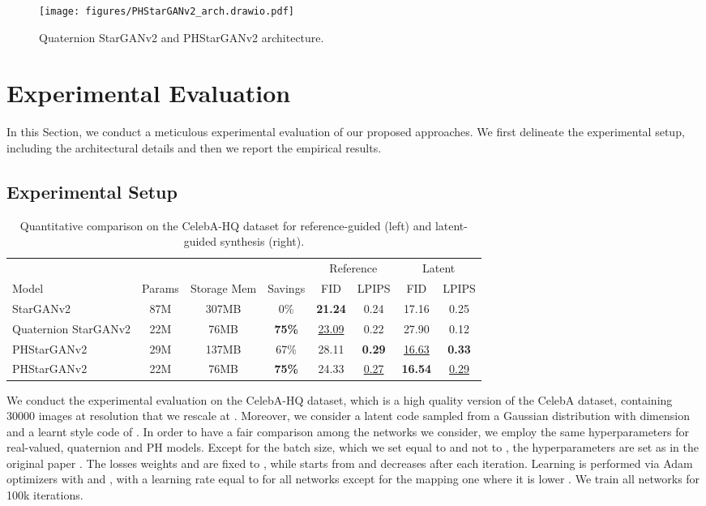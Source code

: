 \documentclass[conference]{IEEEtran}
\begin{document}
\begin{figure*}[t!]
    \centering
    \texttt{[image: figures/PHStarGANv2\_arch.drawio.pdf]}
    \caption{Quaternion StarGANv2 and PHStarGANv2 architecture.}
    \label{fig:arch}
\end{figure*}

\section{Experimental Evaluation}
\label{sec:exp}
In this Section, we conduct a meticulous experimental evaluation of our proposed approaches. We first delineate the experimental setup, including the architectural details and then we report the empirical results.

\subsection{Experimental Setup}

\begin{table*}[t]
\caption{Quantitative comparison on the CelebA-HQ dataset for reference-guided (left) and latent-guided synthesis (right).}
\centering
\label{tab:res_celeba}
\begin{tabular}{l|ccc|cc|cc}
\toprule
 & & & &  \multicolumn{2}{c|}{Reference} & \multicolumn{2}{c}{Latent}  \\
Model & Params & Storage Mem & Savings  & FID  & LPIPS  & FID  & LPIPS  \\
\hline
StarGANv2 & 87M & 307MB & 0\% & \textbf{21.24} & 0.24 & 17.16 & 0.25 \\
Quaternion StarGANv2 & 22M & 76MB & \textbf{75\%} & \underline{23.09} & 0.22 & 27.90 & 0.12 \\
PHStarGANv2  & 29M & 137MB & 67\% & 28.11 & \textbf{0.29} & \underline{16.63} & \textbf{0.33} \\
PHStarGANv2  & 22M & 76MB & \textbf{75\%} & 24.33 & \underline{0.27} & \textbf{16.54} & \underline{0.29} \\
\bottomrule
\end{tabular}
\end{table*}

We conduct the experimental evaluation on the CelebA-HQ dataset, which is a high quality version of the CelebA dataset, containing 30000 images at  resolution that we rescale at . Moreover, we consider a latent code sampled from a Gaussian distribution with dimension  and a learnt style code of .
In order to have a fair comparison among the networks we consider, we employ the same hyperparameters for real-valued, quaternion and PH models. Except for the batch size, which we set equal to  and not to , the hyperparameters are set as in the original paper \cite{Choi2020StarGAN2}. The losses weights  and  are fixed to , while  starts from  and decreases after each iteration. Learning is performed via Adam optimizers with  and , with a learning rate equal to  for all networks except for the mapping one where it is lower . We train all networks for 100k iterations.
\end{document}
